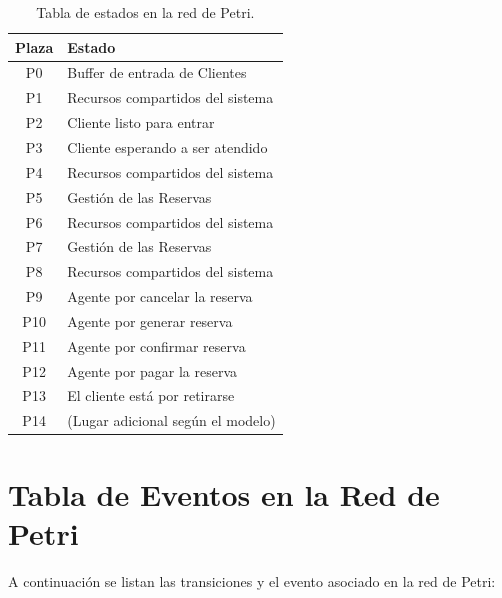 \documentclass[12pt]{article}
\begin{document}
\begin{table}[H]
    \centering
    \renewcommand{\arraystretch}{1.2}
    \begin{tabularx}{\textwidth}{|c|X|}
    \hline
    \rowcolor{gray!20}
    \textbf{Plaza} & \textbf{Estado} \\ \hline
    P0  & Buffer de entrada de Clientes               \\ \hline
    P1  & Recursos compartidos del sistema            \\ \hline
    P2  & Cliente listo para entrar                   \\ \hline
    P3  & Cliente esperando a ser atendido            \\ \hline
    P4  & Recursos compartidos del sistema            \\ \hline
    P5  & Gestión de las Reservas                     \\ \hline
    P6  & Recursos compartidos del sistema            \\ \hline
    P7  & Gestión de las Reservas                     \\ \hline
    P8  & Recursos compartidos del sistema            \\ \hline
    P9  & Agente por cancelar la reserva              \\ \hline
    P10 & Agente por generar reserva                  \\ \hline
    P11 & Agente por confirmar reserva                \\ \hline
    P12 & Agente por pagar la reserva                 \\ \hline
    P13 & El cliente está por retirarse               \\ \hline
    P14 & (Lugar adicional según el modelo)           \\ \hline
    \end{tabularx}
    \caption{Tabla de estados en la red de Petri.}
    \label{tabla:estados-red-petri}
\end{table}

\section{Tabla de Eventos en la Red de Petri}
A continuación se listan las transiciones y el evento asociado en la red de Petri:
\end{document}
